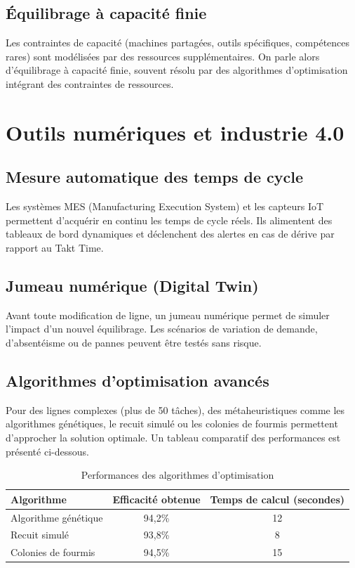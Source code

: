 \documentclass[12pt,a4paper]{article}
\begin{document}
\begin{center}
\subsection{Équilibrage à capacité finie}
Les contraintes de capacité (machines partagées, outils spécifiques, compétences rares) sont modélisées par des ressources supplémentaires. On parle alors d’équilibrage à capacité finie, souvent résolu par des algorithmes d’optimisation intégrant des contraintes de ressources.

\section{Outils numériques et industrie 4.0}

\subsection{Mesure automatique des temps de cycle}
Les systèmes MES (Manufacturing Execution System) et les capteurs IoT permettent d’acquérir en continu les temps de cycle réels. Ils alimentent des tableaux de bord dynamiques et déclenchent des alertes en cas de dérive par rapport au Takt Time.

\subsection{Jumeau numérique (Digital Twin)}
Avant toute modification de ligne, un jumeau numérique permet de simuler l’impact d’un nouvel équilibrage. Les scénarios de variation de demande, d’absentéisme ou de pannes peuvent être testés sans risque.

\subsection{Algorithmes d’optimisation avancés}
Pour des lignes complexes (plus de 50 tâches), des métaheuristiques comme les algorithmes génétiques, le recuit simulé ou les colonies de fourmis permettent d’approcher la solution optimale. Un tableau comparatif des performances est présenté ci-dessous.

\begin{table}[H]
\centering
\caption{Performances des algorithmes d’optimisation}
\label{tab:algo_perf}
\begin{tabular}{|l|c|c|}
\hline
\textbf{Algorithme} & \textbf{Efficacité obtenue} & \textbf{Temps de calcul (secondes)} \\ \hline
Algorithme génétique & 94,2\% & 12 \\
Recuit simulé & 93,8\% & 8 \\
Colonies de fourmis & 94,5\% & 15 \\
\hline
\end{tabular}
\end{table}


\end{center}
\end{document}
